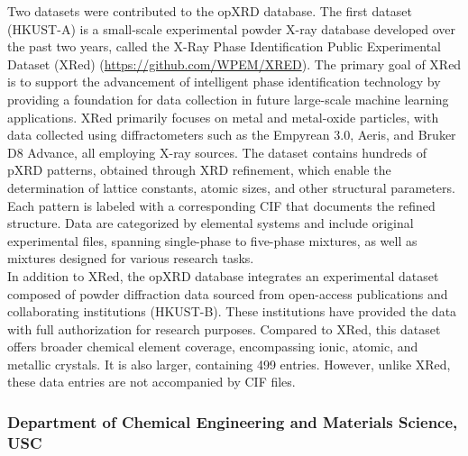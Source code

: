 Two datasets were contributed to the opXRD database. The first dataset (HKUST-A) is a small-scale experimental powder X-ray database developed over the past two years, called the X-Ray Phase Identification Public Experimental Dataset (XRed) (\url{https://github.com/WPEM/XRED}). The primary goal of XRed is to support the advancement of intelligent phase identification technology by providing a foundation for data collection in future large-scale machine learning applications. XRed primarily focuses on metal and metal-oxide particles, with data collected using diffractometers such as the Empyrean 3.0, Aeris, and Bruker D8 Advance, all employing  X-ray sources. The dataset contains hundreds of pXRD patterns, obtained through XRD refinement, which enable the determination of lattice constants, atomic sizes, and other structural parameters. Each pattern is labeled with a corresponding CIF that documents the refined structure. Data are categorized by elemental systems and include original experimental files, spanning single-phase to five-phase mixtures, as well as mixtures designed for various research tasks. \\

In addition to XRed, the opXRD database integrates an experimental dataset composed of powder diffraction data sourced from open-access publications and collaborating institutions (HKUST-B). These institutions have provided the data with full authorization for research purposes. Compared to XRed, this dataset offers broader chemical element coverage, encompassing ionic, atomic, and metallic crystals. It is also larger, containing 499 entries. However, unlike XRed, these data entries are not accompanied by CIF files. \\



\subsubsection*{Department of Chemical Engineering and Materials Science, USC}

